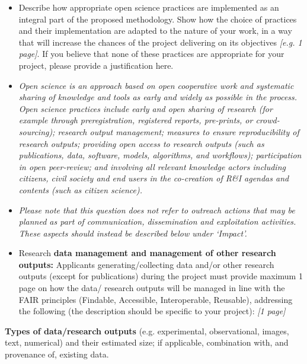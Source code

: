 \begin{itemize}
\item
  Describe how appropriate open science practices are implemented as an
  integral part of the proposed methodology. Show how the choice of
  practices and their implementation are adapted to the nature of your
  work, in a way that will increase the chances of the project
  delivering on its objectives \emph{{[}e.g. 1 page{]}}. If you believe
  that none of these practices are appropriate for your project, please
  provide a justification here.
\end{itemize}

\begin{itemize}
\item
  \emph{Open science is an approach based on open cooperative work and
  systematic sharing of knowledge and tools as early and widely as
  possible in the process. Open science practices include early and open
  sharing of research (for example through preregistration, registered
  reports, pre-prints, or crowd-sourcing); research output management;
  measures to ensure reproducibility of research outputs; providing open
  access to research outputs (such as publications, data, software,
  models, algorithms, and workflows); participation in open peer-review;
  and involving all relevant knowledge actors including citizens, civil
  society and end users in the co-creation of R\&I agendas and contents
  (such as citizen science).}
\item
  \emph{Please note that this question does not refer to outreach
  actions that may be planned as part of communication, dissemination
  and exploitation activities. These aspects should instead be described
  below under `Impact'.}
\end{itemize}

\begin{itemize}
\item
  Research\textbf{ data management and management of other research
  outputs: }Applicants generating/collecting data and/or other research
  outputs (except for publications) during the project must provide
  maximum 1 page on how the data/ research outputs will be managed in
  line with the FAIR principles (Findable, Accessible, Interoperable,
  Reusable), addressing the following (the description should be
  specific to your project): \emph{{[}1 page{]}}
\end{itemize}

\textbf{Types of data/research outputs} (e.g. experimental,
observational, images, text, numerical) and their estimated size; if
applicable, combination with, and provenance of, existing data.

